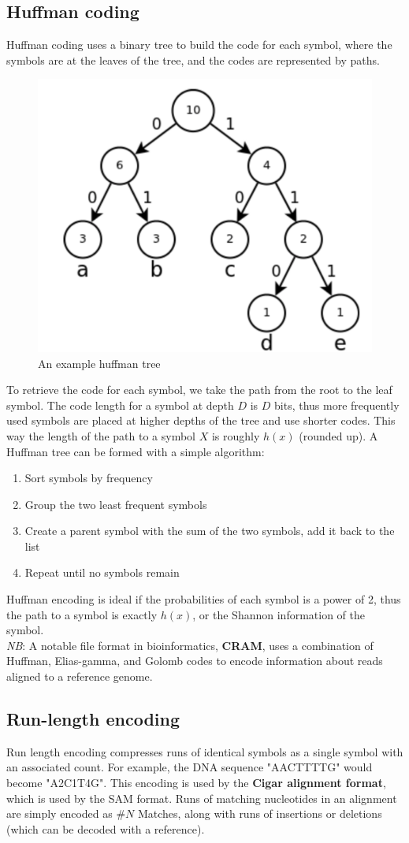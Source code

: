 \documentclass[12pt]{article}
\begin{document}
\subsection{Huffman coding}
Huffman coding uses a binary tree to build the code for each symbol, where the symbols are at the leaves of the tree, and the codes are represented by paths.
\begin{figure}[h]
    \centering
    \includegraphics[width = .5\linewidth]{huffman.png}
    \caption{An example huffman tree}
    \label{fig:huffman}
\end{figure}
To retrieve the code for each symbol, we take the path from the root to the leaf symbol. The code length for a symbol at depth $D$ is $D$ bits, thus more frequently used symbols are placed at higher depths of the tree and use shorter codes. This way the length of the path to a symbol $X$ is roughly $h(x)$ (rounded up). A Huffman tree can be formed with a simple algorithm:
\begin{enumerate}
    \item Sort symbols by frequency
    \item Group the two least frequent symbols 
    \item Create a parent symbol with the sum of the two symbols, add it back to the list
    \item Repeat until no symbols remain
\end{enumerate}
Huffman encoding is ideal if the probabilities of each symbol is a power of 2, thus the path to a symbol is exactly $h(x)$, or the Shannon information of the symbol.\\[10pt]
\textit{NB}: A notable file format in bioinformatics, \textbf{CRAM}, uses a combination of Huffman, Elias-gamma, and Golomb codes to encode information about reads aligned to a reference genome.
\subsection{Run-length encoding}
Run length encoding compresses runs of identical symbols as a single symbol with an associated count. For example, the DNA sequence "AACTTTTG" would become "A2C1T4G". This encoding is used by the \textbf{Cigar alignment format}, which is used by the SAM format. Runs of matching nucleotides in an alignment are simply encoded as \#$N$ Matches, along with runs of insertions or deletions (which can be decoded with a reference).
\end{document}
